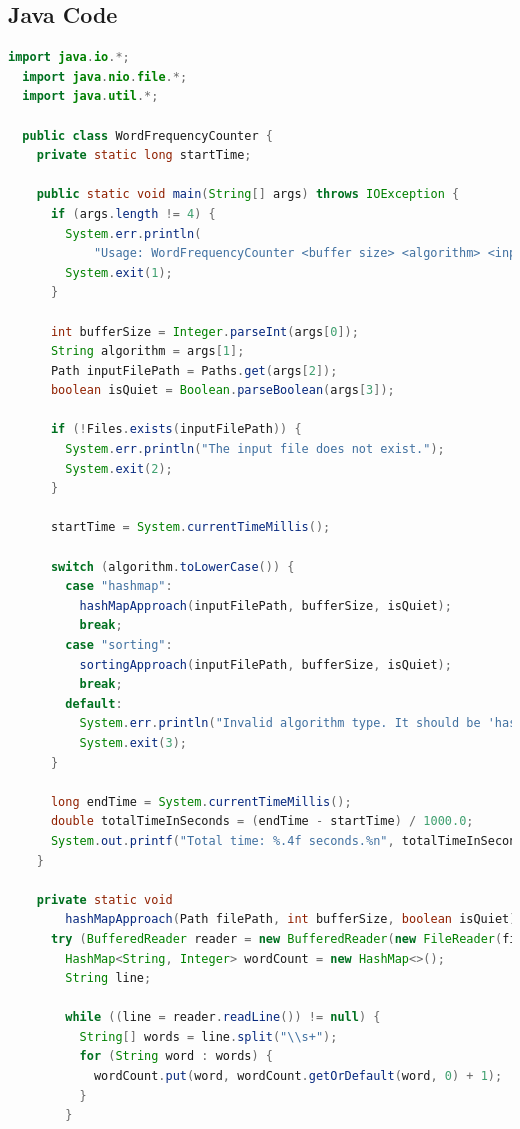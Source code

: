 \documentclass{article}
\begin{document}
\subsection*{Java Code}
\begin{lstlisting}[language=Java, 
  basicstyle=\ttfamily\scriptsize, 
  numbers=none, 
  frame=single,
  showspaces=false,
  caption={Source Code for the WordFrequencyCounter.java file.}]
  import java.io.*;
  import java.nio.file.*;
  import java.util.*;
  
  public class WordFrequencyCounter {
    private static long startTime;
  
    public static void main(String[] args) throws IOException {
      if (args.length != 4) {
        System.err.println(
            "Usage: WordFrequencyCounter <buffer size> <algorithm> <input file> <quiet flag>");
        System.exit(1);
      }
  
      int bufferSize = Integer.parseInt(args[0]);
      String algorithm = args[1];
      Path inputFilePath = Paths.get(args[2]);
      boolean isQuiet = Boolean.parseBoolean(args[3]);
  
      if (!Files.exists(inputFilePath)) {
        System.err.println("The input file does not exist.");
        System.exit(2);
      }
  
      startTime = System.currentTimeMillis();
  
      switch (algorithm.toLowerCase()) {
        case "hashmap":
          hashMapApproach(inputFilePath, bufferSize, isQuiet);
          break;
        case "sorting":
          sortingApproach(inputFilePath, bufferSize, isQuiet);
          break;
        default:
          System.err.println("Invalid algorithm type. It should be 'hashmap' or 'sorting'.");
          System.exit(3);
      }
  
      long endTime = System.currentTimeMillis();
      double totalTimeInSeconds = (endTime - startTime) / 1000.0;
      System.out.printf("Total time: %.4f seconds.%n", totalTimeInSeconds);
    }
  
    private static void
        hashMapApproach(Path filePath, int bufferSize, boolean isQuiet) throws IOException {
      try (BufferedReader reader = new BufferedReader(new FileReader(filePath.toFile()), bufferSize)) {
        HashMap<String, Integer> wordCount = new HashMap<>();
        String line;
  
        while ((line = reader.readLine()) != null) {
          String[] words = line.split("\\s+");
          for (String word : words) {
            wordCount.put(word, wordCount.getOrDefault(word, 0) + 1);
          }
        }
  

\end{lstlisting}
\end{document}
